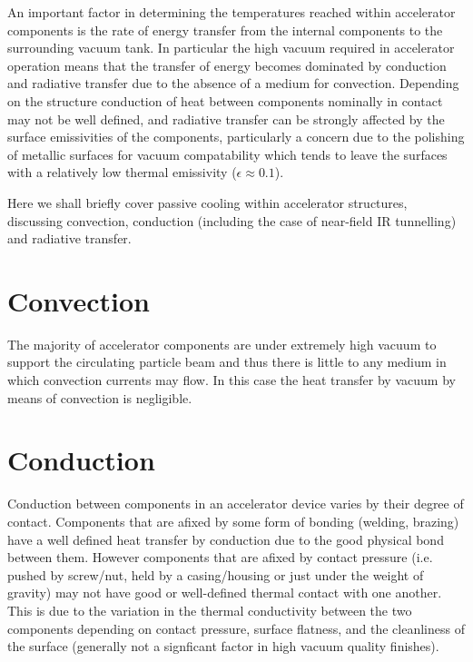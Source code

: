 \label{app:heatTransVac}

An important factor in determining the temperatures reached within accelerator components is the rate of energy transfer from the internal components to the surrounding vacuum tank. In particular the high vacuum required in accelerator operation means that the transfer of energy becomes dominated by conduction and radiative transfer due to the absence of a medium for convection. Depending on the structure conduction of heat between components nominally in contact may not be well defined, and radiative transfer can be strongly affected by the surface emissivities of the components, particularly a concern due to the polishing of metallic surfaces for vacuum compatability which tends to leave the surfaces with a relatively low thermal emissivity ($\epsilon \approx 0.1$).

Here we shall briefly cover passive cooling within accelerator structures, discussing convection, conduction (including the case of near-field IR tunnelling) and radiative transfer.

\section{Convection}

The majority of accelerator components are under extremely high vacuum to support the circulating particle beam and thus there is little to any medium in which convection currents may flow. In this case the heat transfer by vacuum by means of convection is negligible.

\section{Conduction}

Conduction between components in an accelerator device varies by their degree of contact. Components that are afixed by some form of bonding (welding, brazing) have a well defined heat transfer by conduction due to the good physical bond between them. However components that are afixed by contact pressure (i.e. pushed by screw/nut, held by a casing/housing or just under the weight of gravity) may not have good or well-defined thermal contact with one another. This is due to the variation in the thermal conductivity between the two components depending on contact pressure, surface flatness, and the cleanliness of the surface (generally not a signficant factor in high vacuum quality finishes).

